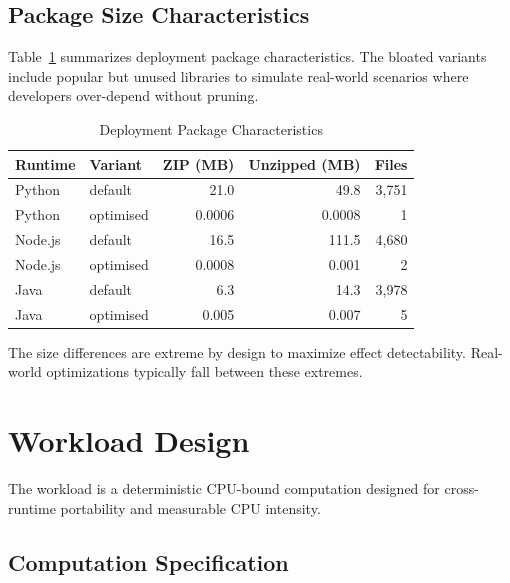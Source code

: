\subsection{Package Size Characteristics}

Table~\ref{tab:package_sizes} summarizes deployment package characteristics. The bloated variants include popular but unused libraries to simulate real-world scenarios where developers over-depend without pruning.

\begin{table}[h]
\centering
\caption{Deployment Package Characteristics}
\label{tab:package_sizes}
\begin{tabular}{llrrr}
\hline
\textbf{Runtime} & \textbf{Variant} & \textbf{ZIP (MB)} & \textbf{Unzipped (MB)} & \textbf{Files} \\
\hline
Python & default & 21.0 & 49.8 & 3,751 \\
Python & optimised & 0.0006 & 0.0008 & 1 \\
Node.js & default & 16.5 & 111.5 & 4,680 \\
Node.js & optimised & 0.0008 & 0.001 & 2 \\
Java & default & 6.3 & 14.3 & 3,978 \\
Java & optimised & 0.005 & 0.007 & 5 \\
\hline
\end{tabular}
\end{table}

The size differences are extreme by design to maximize effect detectability. Real-world optimizations typically fall between these extremes.

\section{Workload Design}
\label{sec:workload}

The workload is a deterministic CPU-bound computation designed for cross-runtime portability and measurable CPU intensity.

\subsection{Computation Specification}

